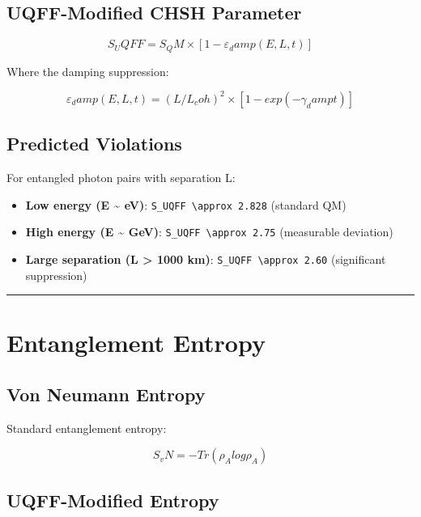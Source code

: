 \documentclass[12pt,a4paper]{article}
\begin{document}
\subsection{UQFF-Modified CHSH Parameter}

\begin{equation}
S_UQFF = S_QM \times [1 - \varepsilon_damp(E,L,t)]
\end{equation}

Where the damping suppression:

\begin{equation}
\varepsilon_damp(E,L,t) = (L/L_coh)^2 \times [1 - exp(-\gamma_damp t)]
\end{equation}

\subsection{Predicted Violations}

For entangled photon pairs with separation L:

\begin{itemize}
  \item \textbf{Low energy (E \textasciitilde{} eV)}: \texttt{S\_UQFF \textbackslash approx 2.828} (standard QM)
  \item \textbf{High energy (E \textasciitilde{} GeV)}: \texttt{S\_UQFF \textbackslash approx 2.75} (measurable deviation)
  \item \textbf{Large separation (L > 1000 km)}: \texttt{S\_UQFF \textbackslash approx 2.60} (significant suppression)
\end{itemize}

\medskip\hrule\medskip

\section{Entanglement Entropy}

\subsection{Von Neumann Entropy}

Standard entanglement entropy:

\begin{equation}
S_vN = -Tr(\rho_A log \rho_A)
\end{equation}

\subsection{UQFF-Modified Entropy}
\end{document}
